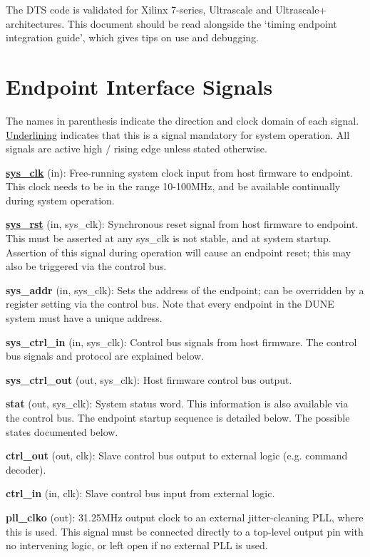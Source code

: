 \documentclass{article}
\begin{document}
The DTS code is validated for Xilinx 7-series, Ultrascale and Ultrascale+ architectures. This document should be read alongside the ‘timing endpoint integration guide’, which gives tips on use and debugging.

\section{Endpoint Interface Signals}

The names in parenthesis indicate the direction and clock domain of each signal. \uline{Underlining} indicates that this is a signal mandatory for system operation. All signals are active high / rising edge unless stated otherwise.

\textbf{\uline{sys\_clk}} (in): Free-running system clock input from host firmware to endpoint. This clock needs to be in the range 10-100MHz, and be available continually during system operation.

\textbf{\uline{sys\_rst}} (in, sys\_clk): Synchronous reset signal from host firmware to endpoint. This must be asserted at any sys\_clk is not stable, and at system startup. Assertion of this signal during operation will cause an endpoint reset; this may also be triggered via the control bus.

\textbf{sys\_addr} (in, sys\_clk): Sets the address of the endpoint; can be overridden by a register setting via the control bus. Note that every endpoint in the DUNE system must have a unique address.

\textbf{sys\_ctrl\_in} (in, sys\_clk): Control bus signals from host firmware. The control bus signals and protocol are explained below.

\textbf{sys\_ctrl\_out} (out, sys\_clk): Host firmware control bus output.

\textbf{stat} (out, sys\_clk): System status word. This information is also available via the control bus. The endpoint startup sequence is detailed below. The possible states documented below.

\textbf{ctrl\_out} (out, clk): Slave control bus output to external logic (e.g. command decoder).

\textbf{ctrl\_in} (in, clk): Slave control bus input from external logic.

\textbf{pll\_clko} (out): 31.25MHz output clock to an external jitter-cleaning PLL, where this is used. This signal must be connected directly to a top-level output pin with no intervening logic, or left open if no external PLL is used.
\end{document}
